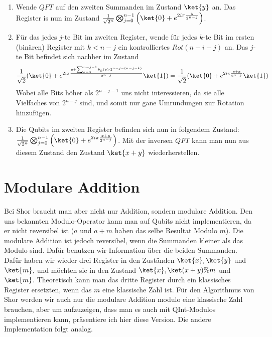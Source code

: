 \begin{enumerate}
    \item Wende $QFT$ auf den zweiten Summanden im Zustand $\ket{y}$ an. Das Register is nun im Zustand $\frac{1}{\sqrt{2^n}}\bigotimes_{j = 0}^{n - 1}\left(\ket{0} + e^{2i\pi\frac{y}{2^{n - j}}}\right)$.
    \item Für das jedes $j$-te Bit im zweiten Register, wende für jedes $k$-te Bit im ersten (binären) Register mit $k < n - j$ ein kontrolliertes $Rot(n - i - j)$ an. Das $j$-te Bit befindet sich nachher im Zustand 
    \begin{align*}
        \frac{1}{\sqrt{2}}(\ket{0} + e^{2i\pi\frac{y + \sum_{k = 0}^{n - j - 1}{b_k(x)\cdot 2^{n - j - (n - j - k)}}}{2^{n - j}}}\ket{1})
        = \frac{1}{\sqrt{2}}(\ket{0} + e^{2i\pi\frac{y + x}{2^{n - j}}}\ket{1})
    \end{align*}
    Wobei alle Bits höher als $2^{n - j - 1}$ uns nicht interessieren, da sie alle Vielfaches von $2^{n - j}$ sind, und somit nur gane Umrundungen zur Rotation hinzufügen.
    \item Die Qubits im zweiten Register befinden sich nun in folgendem Zustand: $\frac{1}{\sqrt{2^n}}\bigotimes_{j = 0}^{n - 1}\left(\ket{0} + e^{2i\pi\frac{x + y}{2^{n - j}}}\right)$. Mit der inversen $QFT$ kann man nun aus diesem Zustand den Zustand $\ket{x + y}$ wiederherstellen.
\end{enumerate}
\section{Modulare Addition}
Bei Shor braucht man aber nicht nur Addition, sondern modulare Addition. Den uns bekannten Modulo-Operator kann man auf Qubits nicht implementieren, da er nicht reversibel ist ($a$ und $a + m$ haben das selbe Resultat Modulo $m$). Die modulare Addition ist jedoch reversibel, wenn die Summanden kleiner als das Modulo sind. Dafür benutzen wir Information über die beiden Summanden. Dafür haben wir wieder drei Register in den Zuständen $\ket{x}, \ket{y}$ und $\ket{m}$, und möchten sie in den Zustand $\ket{x}, \ket{(x + y) \% m}$ und $\ket{m}$. Theoretisch kann man das dritte Register durch ein klassisches Register ersetzten, wenn das $m$ eine klassische Zahl ist. Für den Algorithmus von Shor werden wir auch nur die modulare Addition modulo eine klassische Zahl brauchen, aber um aufzuzeigen, dass man es auch mit QInt-Modulos implementieren kann, präsentiere ich hier diese Version. Die andere Implementation folgt analog. 

